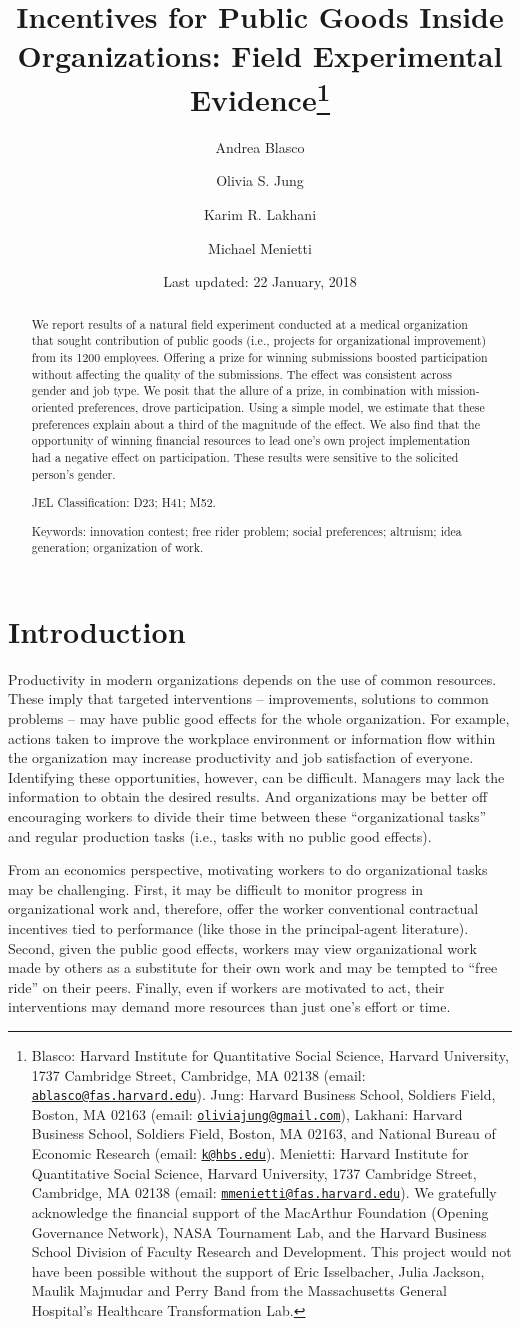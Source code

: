 \documentclass[12pt, titlepage]{article}
\title{Incentives for Public Goods Inside Organizations: Field Experimental
Evidence\thanks{Blasco: Harvard Institute for Quantitative Social Science, Harvard
University, 1737 Cambridge Street, Cambridge, MA 02138 (email:
\href{mailto:ablasco@fas.harvard.edu}{\nolinkurl{ablasco@fas.harvard.edu}}).
Jung: Harvard Business School, Soldiers Field, Boston, MA 02163 (email:
\href{mailto:oliviajung@gmail.com}{\nolinkurl{oliviajung@gmail.com}}),
Lakhani: Harvard Business School, Soldiers Field, Boston, MA 02163, and
National Bureau of Economic Research (email:
\href{mailto:k@hbs.edu}{\nolinkurl{k@hbs.edu}}). Menietti: Harvard
Institute for Quantitative Social Science, Harvard University, 1737
Cambridge Street, Cambridge, MA 02138 (email:
\href{mailto:mmenietti@fas.harvard.edu}{\nolinkurl{mmenietti@fas.harvard.edu}}).
We gratefully acknowledge the financial support of the MacArthur
Foundation (Opening Governance Network), NASA Tournament Lab, and the
Harvard Business School Division of Faculty Research and Development.
This project would not have been possible without the support of Eric
Isselbacher, Julia Jackson, Maulik Majmudar and Perry Band from the
Massachusetts General Hospital's Healthcare Transformation Lab.}}
\author{Andrea Blasco \and Olivia S. Jung \and Karim R. Lakhani \and Michael Menietti}
\date{Last updated: 22 January, 2018}
\begin{document}
\maketitle
\begin{abstract}
We report results of a natural field experiment conducted at a medical
organization that sought contribution of public goods (i.e., projects
for organizational improvement) from its 1200 employees. Offering a
prize for winning submissions boosted participation without affecting
the quality of the submissions. The effect was consistent across gender
and job type. We posit that the allure of a prize, in combination with
mission-oriented preferences, drove participation. Using a simple model,
we estimate that these preferences explain about a third of the
magnitude of the effect. We also find that the opportunity of winning
financial resources to lead one's own project implementation had a
negative effect on participation. These results were sensitive to the
solicited person's gender.

\smallskip\noindent 
JEL Classification: D23; H41; M52.

\smallskip\noindent 
Keywords: innovation contest; free rider problem; social preferences; altruism; idea generation; organization of work.
\end{abstract}


\clearpage

\section{Introduction}\label{introduction}

Productivity in modern organizations depends on the use of common
resources. These imply that targeted interventions -- improvements,
solutions to common problems -- may have public good effects for the
whole organization. For example, actions taken to improve the workplace
environment or information flow within the organization may increase
productivity and job satisfaction of everyone. Identifying these
opportunities, however, can be difficult. Managers may lack the
information to obtain the desired results. And organizations may be
better off encouraging workers to divide their time between these
``organizational tasks'' and regular production tasks (i.e., tasks with
no public good effects).

From an economics perspective, motivating workers to do organizational
tasks may be challenging. First, it may be difficult to monitor progress
in organizational work and, therefore, offer the worker conventional
contractual incentives tied to performance (like those in the
principal-agent literature). Second, given the public good effects,
workers may view organizational work made by others as a substitute for
their own work and may be tempted to ``free ride'' on their peers.
Finally, even if workers are motivated to act, their interventions may
demand more resources than just one's effort or time.
\end{document}
